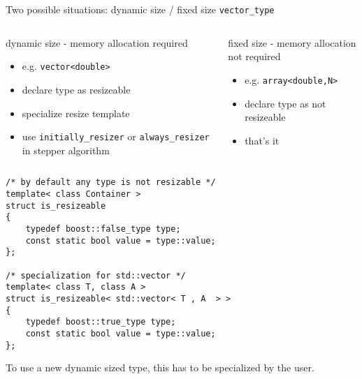 \begin{frame}[fragile]
Two possible situations: dynamic size / fixed size \lstinline+vector_type+
\vspace{0.5em}

\begin{columns}[t]

 \begin{column}{0.5\linewidth}
  \begin{block}{dynamic size - memory allocation required}
   \begin{itemize}
    \item e.g. \lstinline+vector<double>+
    \item declare type as resizeable
    \item specialize resize template
    \item use \lstinline+initially_resizer+ or \lstinline+always_resizer+ in stepper algorithm
   \end{itemize}
  \end{block}
 \end{column}

 \begin{column}{0.5\linewidth}
  \begin{block}{fixed size - memory allocation not required}
   \begin{itemize}
    \item e.g. \lstinline+array<double,N>+
    \item declare type as not resizeable
    \item that's it
   \end{itemize}
  \end{block}
 \end{column}

\end{columns}

\end{frame}

\begin{frame}[fragile]

\begin{lstlisting}
/* by default any type is not resizable */
template< class Container >
struct is_resizeable
{
    typedef boost::false_type type;
    const static bool value = type::value;
};

/* specialization for std::vector */
template< class T, class A >
struct is_resizeable< std::vector< T , A  > >
{
    typedef boost::true_type type;
    const static bool value = type::value;
}; 
\end{lstlisting}
To use a new dynamic sized type, this has to be specialized by the user.
\end{frame}


